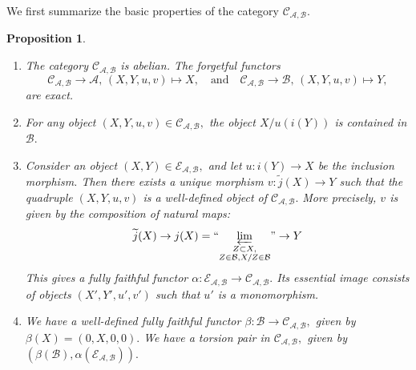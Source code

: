 \documentclass[11pt,leqno]{amsart}
\newtheorem{prop}[theo]{Proposition}
\numberwithin{equation}{section}
\def\wt{\widetilde}
\newcommand{\prolim}[1][]{\mathop{\varprojlim}\limits_{#1}}
\newcommand{\proolim}[1][]{{``{\prolim[#1]}"}}
\newcommand{\cA}{{\mathcal A}}
\newcommand{\cB}{{\mathcal B}}
\newcommand{\cC}{{\mathcal C}}
\newcommand{\cE}{{\mathcal E}}
\begin{document}
We first summarize the basic properties of the category $\cC_{\cA,\cB}.$

\begin{prop}\label{prop:properties_of_C_AB}
\begin{enumerate}[label=(\roman*),ref=(\roman*)]
	\item The category $\cC_{\cA,\cB}$ is abelian. The forgetful functors 
	\begin{equation*}
	\cC_{\cA,\cB}\to\cA,\,(X,Y,u,v)\mapsto X,\quad\text{and}\quad \cC_{\cA,\cB}\to\cB,\,(X,Y,u,v)\mapsto Y,
	\end{equation*} are exact. \label{abelian_category}
	\item For any object $(X,Y,u,v)\in\cC_{\cA,\cB},$ the object $X/u(i(Y))$ is contained in $\cB.$ \label{cokernel_in_B}
	\item Consider an object $(X,Y)\in\cE_{\cA,\cB},$ and let $u:i(Y)\to X$ be the inclusion morphism. Then there exists a unique morphism $v:\wt{j}(X)\to Y$ such that the quadruple $(X,Y,u,v)$ is a well-defined object of $\cC_{\cA,\cB}.$ More precisely, $v$ is given by the composition of natural maps:
	\begin{equation}\label{eq:composition_defining_v}
	\wt{j}(X)\to j(X)=\proolim[\substack{Z\subset X,\\ Z\in\cB, X/Z\in\cB}]\to Y
	\end{equation}
	 This gives a fully faithful functor $\alpha:\cE_{\cA,\cB}\to \cC_{\cA,\cB}.$ Its essential image consists of objects $(X',Y',u',v')$ such that $u'$ is a monomorphism. \label{inclusion_of_E_AB}
	 \item We have a well-defined fully faithful functor $\beta:\cB\to\cC_{\cA,\cB},$ given by $\beta(X)=(0,X,0,0).$ We have a torsion pair in $\cC_{\cA,\cB},$ given by $(\beta(\cB),\alpha(\cE_{\cA,\cB})).$ \label{torsion_pair}
\end{enumerate}
\end{prop}
\end{document}
